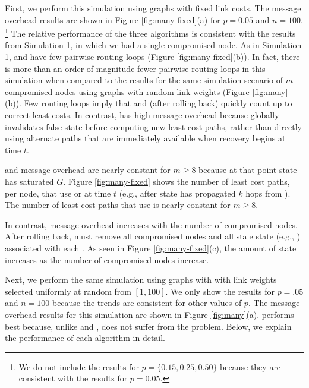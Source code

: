First, we perform this simulation using \er graphs with fixed link costs.  The message overhead results are shown in Figure \ref{fig:many-fixed}(a) for $p=0.05$ and $n=100$. 
{\footnote {\small We do not include the results for $p=\{0.15,0.25,0.50\}$ because they are consistent with the results for $p=0.05$.}}
The relative performance of the three algorithms is consistent with the results from Simulation 1, in which we had a single compromised node.
As in Simulation 1, \second and \cpr have few pairwise routing loops (Figure \ref{fig:many-fixed}(b)).  In fact, there is more than an order of magnitude fewer pairwise routing 
loops in this simulation
when compared to the results for the same simulation scenario of $m$ compromised nodes using \er graphs with random link weights (Figure \ref{fig:many}(b)).
Few routing loops imply that \second and \cpr (after rolling back) quickly count up to correct least costs.
In contrast, \purge has high message overhead because \purge globally invalidates false state before computing new least cost paths, rather than directly using alternate paths that 
are immediately available when recovery begins at time $t$. 

\second and \purge message overhead are nearly constant for $m \geq 8$ because at that point \badvector state has saturated $G$.
Figure \ref{fig:many-fixed} shows the number of least cost paths, per node,
that use \badvector or \oldvector at time $t$ (e.g., after \badvector state has propagated $k$ hops from \bads).  The number of least cost paths that use \badvector is nearly constant for $m \geq 8$. 

In contrast, \cpr message overhead increases with the number of compromised nodes.  After rolling back, \cpr must remove all compromised nodes and all
stale state (e.g., \oldvectors) associated with each \bads. As seen in Figure \ref{fig:many-fixed}(c), 
the amount of \oldvector state increases as the number of compromised nodes increase. 

Next, we perform the same simulation using \er graphs with with link weights selected uniformly at random from $[1,100]$. We only show the results for $p=.05$ and $n=100$ because the 
trends are consistent for other values of $p$.
The message overhead results for this simulation are shown in Figure \ref{fig:many}(a). \purge performs best because, unlike \second and \cprs, \purge does not suffer 
from the \infinity problem.  Below, we explain the performance of each algorithm in detail.

